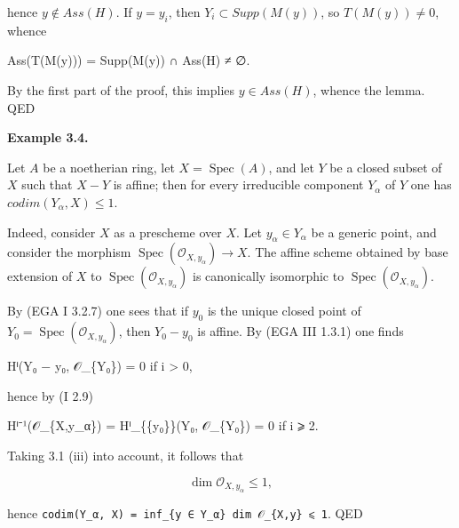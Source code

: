 \documentclass[
]{article}
\newenvironment{Shaded}{}{}
\newcommand{\NormalTok}[1]{#1}
\begin{document}
hence \(y \notin Ass(H)\). If \(y = y_{i}\), then
\(Y_{i} \subset Supp(M(y))\), so \(T(M(y)) \neq 0\), whence

\begin{Shaded}
\begin{Highlighting}[]
\NormalTok{Ass(T(M(y))) = Supp(M(y)) ∩ Ass(H) ≠ ∅.}
\end{Highlighting}
\end{Shaded}

By the first part of the proof, this implies \(y \in Ass(H)\), whence
the lemma. QED

\textbf{Example 3.4.}

Let \(A\) be a noetherian ring, let \(X = \operatorname{Spec}(A)\), and
let \(Y\) be a closed subset of \(X\) such that \(X - Y\) is affine;
then for every irreducible component \(Y_{\alpha}\) of \(Y\) one has
\(codim(Y_{\alpha}, X) \leqslant 1\).

Indeed, consider \(X\) as a prescheme over \(X\). Let
\(y_{\alpha} \in Y_{\alpha}\) be a generic point, and consider the
morphism \(\operatorname{Spec}(\mathcal{O}_{X,y_{\alpha}}) \to X\). The
affine scheme obtained by base extension of \(X\) to
\(\operatorname{Spec}(\mathcal{O}_{X,y_{\alpha}})\) is canonically
isomorphic to \(\operatorname{Spec}(\mathcal{O}_{X,y_{\alpha}})\).

By (EGA I 3.2.7) one sees that if \(y_{0}\) is the unique closed point
of \(Y_{0} = \operatorname{Spec}(\mathcal{O}_{X,y_{\alpha}})\), then
\(Y_{0} - y_{0}\) is affine. By (EGA III 1.3.1) one finds

\begin{Shaded}
\begin{Highlighting}[]
\NormalTok{Hⁱ(Y₀ − y₀, 𝒪\_\{Y₀\}) = 0   if i \textgreater{} 0,}
\end{Highlighting}
\end{Shaded}

hence by (I 2.9)

\begin{Shaded}
\begin{Highlighting}[]
\NormalTok{Hⁱ⁻¹(𝒪\_\{X,y\_α\}) = Hⁱ\_\{\{y₀\}\}(Y₀, 𝒪\_\{Y₀\}) = 0   if i ⩾ 2.}
\end{Highlighting}
\end{Shaded}

Taking 3.1 (iii) into account, it follows that

\[
\dim \mathcal{O}_{X,y_{\alpha}} \leqslant 1,
\]

hence
\texttt{codim(Y\_α,\ X)\ =\ inf\_\{y\ ∈\ Y\_α\}\ dim\ 𝒪\_\{X,y\}\ ⩽\ 1}.
QED
\end{document}
